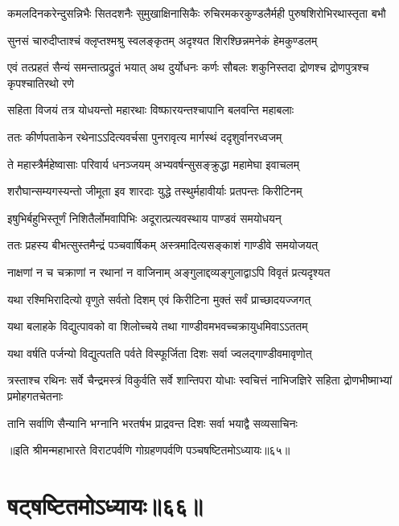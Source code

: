 \fourlineindentedshloka
{कमलदिनकरेन्दुसन्निभैः}
{सितदशनैः सुमुखाक्षिनासिकैः}
{रुचिरमकरकुण्डलैर्मही}
{पुरुषशिरोभिरथास्तृता बभौ}


\twolineshloka
{सुनसं चारुदीप्ताश्चं क्लृप्तश्मश्रु स्वलङ्कृतम्}
{अदृश्यत शिरश्छिन्नमनेकं हेमकुण्डलम्}


\onelineshloka
{एवं तत्प्रहतं सैन्यं समन्तात्प्रद्रुतं भयात्}
\twolineshloka
{अथ दुर्योधनः कर्णः सौबलः शकुनिस्तदा}
{द्रोणश्च द्रोणपुत्रश्च कृपश्चातिरथो रणे}


\twolineshloka
{सहिता विजयं तत्र योधयन्तो महारथाः}
{विष्फारयन्तश्चापानि बलवन्ति महाबलाः}


\twolineshloka
{ततः कीर्णपताकेन रथेनाऽऽदित्यवर्चसा}
{पुनरावृत्य मार्गस्थं ददृशुर्वानरध्वजम्}


\twolineshloka
{ते महास्त्रैर्महेष्वासाः परिवार्य धनञ्जयम्}
{अभ्यवर्षन्सुसङ्क्रुद्धा महामेघा इवाचलम्}


\twolineshloka
{शरौघान्सम्यगस्यन्तो जीमूता इव शारदाः}
{युद्धे तस्थुर्महावीर्याः प्रतपन्तः किरीटिनम्}


\twolineshloka
{इषुभिर्बहुभिस्तूर्णं निशितैर्लोमवापिभिः}
{अदूरात्प्रत्यवस्थाय पाण्डवं समयोधयन्}


\twolineshloka
{ततः प्रहस्य बीभत्सुस्तमैन्द्रं पञ्चवार्षिकम्}
{अस्त्रमादित्यसङ्काशं गाण्डीवे समयोजयत्}


\twolineshloka
{नाक्षणां न च चक्राणां न रथानां न वाजिनाम्}
{अङ्गुलाद्दव्यङ्गुलाद्वाऽपि विवृतं प्रत्यदृश्यत}


\twolineshloka
{यथा रश्मिभिरादित्यो वृणुते सर्वतो दिशम्}
{एवं किरीटिना मुक्तं सर्वं प्राच्छादयज्जगत्}


\twolineshloka
{यथा बलाहके विद्युत्पावको वा शिलोच्चये}
{तथा गाण्डीवमभवच्चक्रायुधमिवाऽऽततम्}


\twolineshloka
{यथा वर्षति पर्जन्यो विद्युत्पतति पर्वते}
{विस्फूर्जिता दिशः सर्वा ज्वलद्गाण्डीवमावृणोत्}


\threelineshloka
{त्रस्ताश्च रथिनः सर्वे चैन्द्रमस्त्रं विकुर्वति}
{सर्वे शान्तिपरा योधाः स्वचित्तं नाभिजज्ञिरे}
{सहिता द्रोणभीष्माभ्यां प्रमोहगतचेतनाः}


\twolineshloka
{तानि सर्वाणि सैन्यानि भग्नानि भरतर्षभ}
{प्राद्रवन्त दिशः सर्वा भयाद्वै सव्यसाचिनः}

॥इति श्रीमन्महाभारते विराटपर्वणि गोग्रहणपर्वणि पञ्चषष्टितमोऽध्यायः॥६५॥

\chapter{षट्षष्टितमोऽध्यायः॥६६॥}

